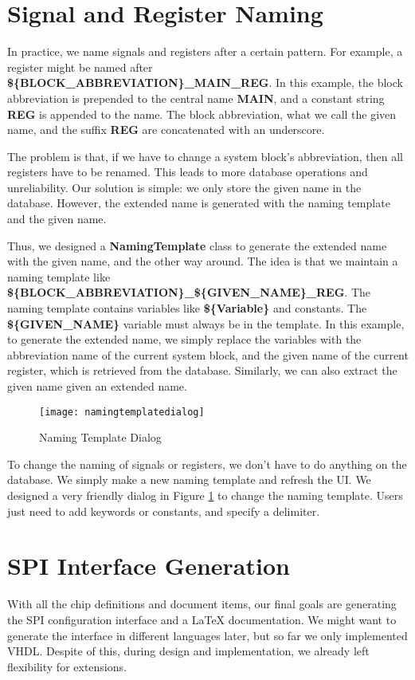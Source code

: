 \section{Signal and Register Naming}
In practice, we name signals and registers after a certain pattern. For example, a register might be named after \textbf{\$\{BLOCK\_ABBREVIATION\}\_MAIN\_REG}. In this example, the block abbreviation is prepended to the central name \textbf{MAIN}, and a constant string \textbf{REG} is appended to the name. The block abbreviation, what we call the given name, and the suffix \textbf{REG} are concatenated with an underscore.

The problem is that, if we have to change a system block's abbreviation, then all registers have to be renamed. This leads to more database operations and unreliability. Our solution is simple: we only store the given name in the database. However, the extended name is generated with the naming template and the given name. 

Thus, we designed a \textbf{NamingTemplate} class to generate the extended name with the given name, and the other way around. The idea is that we maintain a naming template like \textbf{\$\{BLOCK\_ABBREVIATION\}\_\$\{GIVEN\_NAME\}\_REG}. The naming template contains variables like \textbf{\$\{Variable\}} and constants. The \textbf{\$\{GIVEN\_NAME\}} variable must always be in the template. In this example, to generate the extended name, we simply replace the variables with the abbreviation name of the current system block, and the given name of the current register, which is retrieved from the database. Similarly, we can also extract the given name given an extended name.

\begin{figure}[htb]
\centering
\texttt{[image: namingtemplatedialog]}
\caption{Naming Template Dialog\label{fig:Naming Template Dialog}}
\end{figure} 

To change the naming of signals or registers, we don't have to do anything on the database. We simply make a new naming template and refresh the UI. We designed a very friendly dialog in Figure \ref{fig:Naming Template Dialog} to change the naming template. Users just need to add keywords or constants, and specify a delimiter.

\section{SPI Interface Generation}
With all the chip definitions and document items, our final goals are generating the SPI configuration interface and a LaTeX documentation. We might want to generate the interface in different languages later, but so far we only implemented VHDL. Despite of this, during design and implementation, we already left flexibility for extensions.

